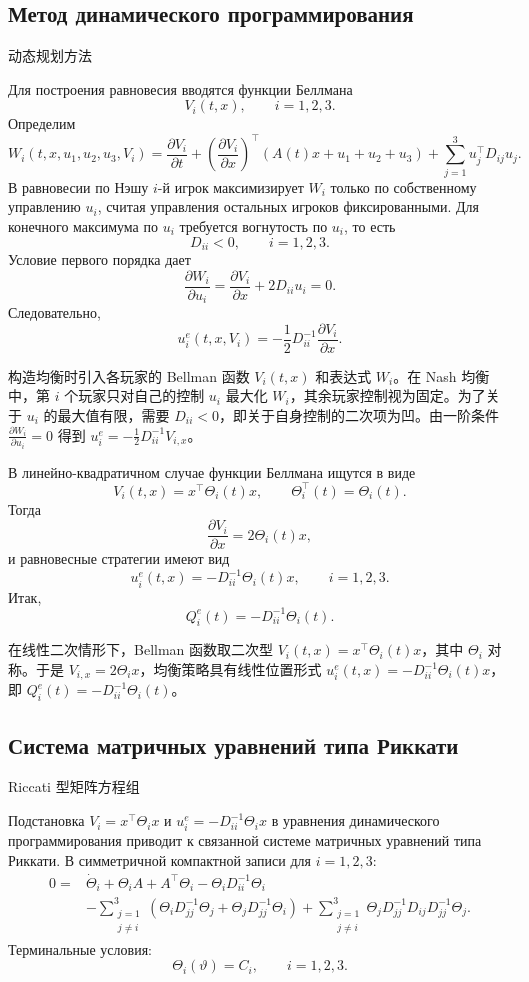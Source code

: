 \documentclass[12pt,a4paper]{article}
\newcommand{\zh}[1]{\par\noindent #1\par}
\begin{document}
\subsection*{Метод динамического программирования}
\zh{动态规划方法}
Для построения равновесия вводятся функции Беллмана
\[
V_i(t,x),\qquad i=1,2,3.
\]
Определим
\[
W_i(t,x,u_1,u_2,u_3,V_i)=
\frac{\partial V_i}{\partial t}+
\left(\frac{\partial V_i}{\partial x}\right)^{\top}(A(t)x+u_1+u_2+u_3)+
\sum_{j=1}^3u_j^{\top} D_{ij}u_j .
\]
В равновесии по Нэшу \(i\)-й игрок максимизирует \(W_i\) только по собственному управлению \(u_i\), считая управления остальных игроков фиксированными. Для конечного максимума по \(u_i\) требуется вогнутость по \(u_i\), то есть
\[
D_{ii}<0,
\qquad i=1,2,3.
\]
Условие первого порядка дает
\[
\frac{\partial W_i}{\partial u_i}=\frac{\partial V_i}{\partial x}+2D_{ii}u_i=0.
\]
Следовательно,
\[
u_i^e(t,x,V_i)=-\frac12D_{ii}^{-1}\frac{\partial V_i}{\partial x}.
\]
\zh{构造均衡时引入各玩家的 Bellman 函数 \(V_i(t,x)\) 和表达式 \(W_i\)。在 Nash 均衡中，第 \(i\) 个玩家只对自己的控制 \(u_i\) 最大化 \(W_i\)，其余玩家控制视为固定。为了关于 \(u_i\) 的最大值有限，需要 \(D_{ii}<0\)，即关于自身控制的二次项为凹。由一阶条件 \(\frac{\partial W_i}{\partial u_i}=0\) 得到 \(u_i^e=-\frac12D_{ii}^{-1}V_{i,x}\)。}

В линейно-квадратичном случае функции Беллмана ищутся в виде
\[
V_i(t,x)=x^{\top}\Theta_i(t)x,
\qquad \Theta_i^{\top}(t)=\Theta_i(t).
\]
Тогда
\[
\frac{\partial V_i}{\partial x}=2\Theta_i(t)x,
\]
и равновесные стратегии имеют вид
\[
u_i^e(t,x)=-D_{ii}^{-1}\Theta_i(t)x,
\qquad i=1,2,3.
\]
Итак,
\[
Q_i^e(t)=-D_{ii}^{-1}\Theta_i(t).
\]
\zh{在线性二次情形下，Bellman 函数取二次型 \(V_i(t,x)=x^\top\Theta_i(t)x\)，其中 \(\Theta_i\) 对称。于是 \(V_{i,x}=2\Theta_i x\)，均衡策略具有线性位置形式 \(u_i^e(t,x)=-D_{ii}^{-1}\Theta_i(t)x\)，即 \(Q_i^e(t)=-D_{ii}^{-1}\Theta_i(t)\)。}

\subsection*{Система матричных уравнений типа Риккати}
\zh{Riccati 型矩阵方程组}
Подстановка \(V_i=x^{\top}\Theta_i x\) и \(u_i^e=-D_{ii}^{-1}\Theta_i x\) в уравнения динамического программирования приводит к связанной системе матричных уравнений типа Риккати. В симметричной компактной записи для \(i=1,2,3\):
\[
\begin{aligned}
0={}&\dot\Theta_i+\Theta_iA+A^{\top}\Theta_i-\Theta_iD_{ii}^{-1}\Theta_i \\
&-\sum_{\substack{j=1\\ j\ne i}}^3
\left(\Theta_iD_{jj}^{-1}\Theta_j+\Theta_jD_{jj}^{-1}\Theta_i\right)
+\sum_{\substack{j=1\\ j\ne i}}^3
\Theta_jD_{jj}^{-1}D_{ij}D_{jj}^{-1}\Theta_j .
\end{aligned}
\]
Терминальные условия:
\[
\Theta_i(\vartheta)=C_i,\qquad i=1,2,3.
\]
\end{document}
